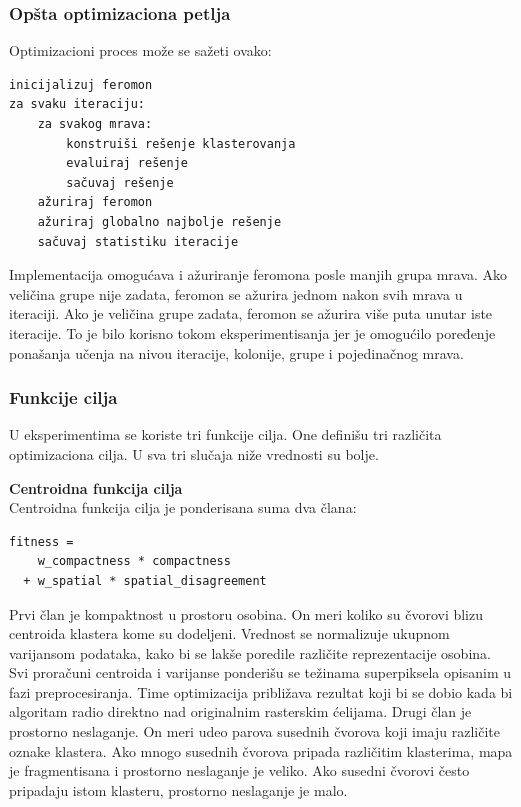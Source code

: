 \documentclass[11pt]{article}
\begin{document}
\subsubsection{Opšta optimizaciona petlja}
Optimizacioni proces može se sažeti ovako:
\begin{verbatim}
inicijalizuj feromon
za svaku iteraciju:
    za svakog mrava:
        konstruiši rešenje klasterovanja
        evaluiraj rešenje
        sačuvaj rešenje
    ažuriraj feromon
    ažuriraj globalno najbolje rešenje
    sačuvaj statistiku iteracije
\end{verbatim}

Implementacija omogućava i ažuriranje feromona posle manjih grupa mrava. Ako veličina grupe nije zadata, feromon se ažurira jednom nakon svih mrava u iteraciji. Ako je veličina grupe zadata, feromon se ažurira više puta unutar iste iteracije. To je bilo korisno tokom eksperimentisanja jer je omogućilo poređenje ponašanja učenja na nivou iteracije, kolonije, grupe i pojedinačnog mrava.

\subsubsection{Funkcije cilja}
U eksperimentima se koriste tri funkcije cilja. One definišu tri različita optimizaciona cilja. U sva tri slučaja niže vrednosti su bolje.

\textbf{Centroidna funkcija cilja} \\
Centroidna funkcija cilja je ponderisana suma dva člana:
\begin{verbatim}
fitness =
    w_compactness * compactness
  + w_spatial * spatial_disagreement
\end{verbatim}

Prvi član je kompaktnost u prostoru osobina. On meri koliko su čvorovi blizu centroida klastera kome su dodeljeni. Vrednost se normalizuje ukupnom varijansom podataka, kako bi se lakše poredile različite reprezentacije osobina. Svi proračuni centroida i varijanse ponderišu se težinama superpiksela opisanim u fazi preprocesiranja. Time optimizacija približava rezultat koji bi se dobio kada bi algoritam radio direktno nad originalnim rasterskim ćelijama.
Drugi član je prostorno neslaganje. On meri udeo parova susednih čvorova koji imaju različite oznake klastera. Ako mnogo susednih čvorova pripada različitim klasterima, mapa je fragmentisana i prostorno neslaganje je veliko. Ako susedni čvorovi često pripadaju istom klasteru, prostorno neslaganje je malo.
\end{document}
